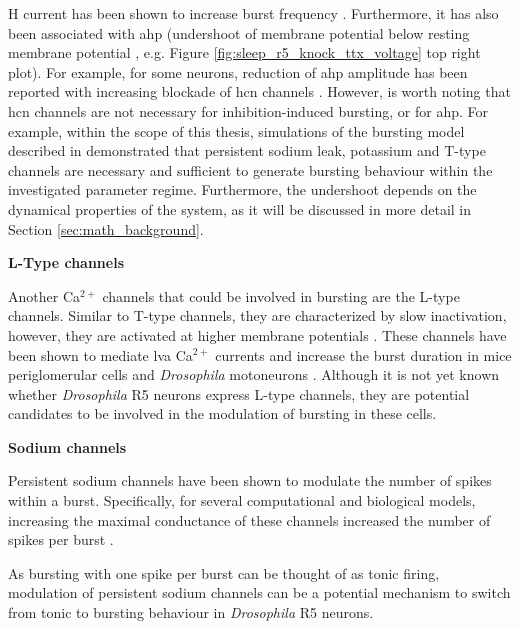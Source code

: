 \documentclass[../main.tex]{subfiles}
\begin{document}
H current has been shown to increase burst frequency \parencite{liuMultipleConductancesCooperatively2008,mccormickModelElectrophysiologicalProperties1992}.
Furthermore, it has also been associated with \gls{ahp} (undershoot of membrane potential below resting membrane potential \parencite{mccormickModelElectrophysiologicalProperties1992}, e.g. Figure \ref{fig:sleep_r5_knock_ttx_voltage} top right plot). For example, for some neurons, reduction of \gls{ahp} amplitude has been reported with increasing blockade of \gls{hcn} channels \parencite{oswaldIHCurrentGenerates2009,boninHyperpolarizationActivatedCurrentIh2013}.
However, is worth noting that \gls{hcn} channels are not necessary for inhibition-induced bursting,
or for \gls{ahp}. For example, within the scope of this thesis, simulations of the bursting model described in \parencite{wangMultipleDynamicalModes1994}
demonstrated that persistent sodium leak, potassium and T-type channels are necessary and sufficient to generate bursting behaviour within the investigated parameter regime.
Furthermore, the undershoot depends on the dynamical properties of the system, as it will be discussed in more detail in Section \ref{sec:math_background}.

\noindent\textbf{L-Type channels}

Another Ca$^{2+}$ channels that could be involved in bursting are the L-type channels. Similar to T-type channels, they are characterized by slow inactivation, however, they are activated at higher membrane potentials \parencite{liuMultipleConductancesCooperatively2008}.
These channels have been shown to mediate \gls{lva} Ca$^{2+}$ currents and increase the burst duration in mice periglomerular cells \parencite{liuMultipleConductancesCooperatively2008} and \textit{Drosophila} motoneurons \parencite{kadasDendriticAxonalLType2017}.
Although it is not yet known whether \textit{Drosophila} R5 neurons express L-type channels, they are potential candidates to be involved in the modulation of bursting in these cells.


\noindent\textbf{Sodium channels}

Persistent sodium channels have been shown to modulate the number of spikes within a burst. Specifically, for several computational and biological models, increasing the maximal conductance of these channels increased the number of spikes per burst \parencite{liuMultipleConductancesCooperatively2008,golombContributionPersistentNa2006}.

As bursting with one spike per burst can be thought of as tonic firing, modulation of persistent sodium channels can be a potential mechanism to switch from tonic to bursting behaviour in \textit{Drosophila} R5 neurons.
\end{document}
